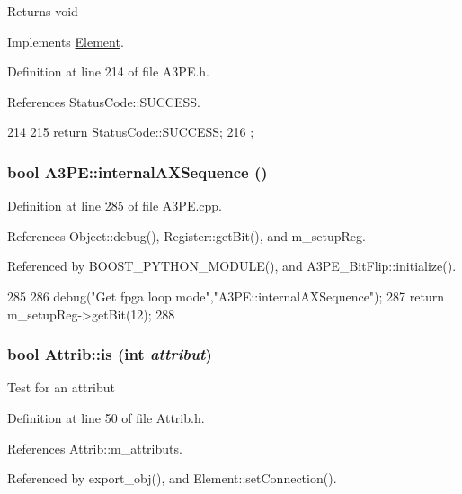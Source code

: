 \begin{DoxyReturn}{Returns}
void 
\end{DoxyReturn}


Implements \hyperlink{classElement_af42754b5cabc198869222725218d695c}{Element}.

Definition at line 214 of file A3PE.h.

References StatusCode::SUCCESS.


\begin{DoxyCode}
214                     {
215     return StatusCode::SUCCESS;
216   };
\end{DoxyCode}
\hypertarget{classA3PE_a4b9cf42bdd0a14e48807faa0956c59bd}{
\subsubsection[{internalAXSequence}]{\setlength{\rightskip}{0pt plus 5cm}bool A3PE::internalAXSequence ()}}
\label{classA3PE_a4b9cf42bdd0a14e48807faa0956c59bd}


Definition at line 285 of file A3PE.cpp.

References Object::debug(), Register::getBit(), and m\_\-setupReg.

Referenced by BOOST\_\-PYTHON\_\-MODULE(), and A3PE\_\-BitFlip::initialize().


\begin{DoxyCode}
285                              {
286   debug("Get fpga loop mode","A3PE::internalAXSequence");
287   return m_setupReg->getBit(12);
288 }
\end{DoxyCode}
\hypertarget{classAttrib_a704f26af560909ad22065083bb7d4c34}{
\subsubsection[{is}]{\setlength{\rightskip}{0pt plus 5cm}bool Attrib::is (int {\em attribut})}}
\label{classAttrib_a704f26af560909ad22065083bb7d4c34}
Test for an attribut 

Definition at line 50 of file Attrib.h.

References Attrib::m\_\-attributs.

Referenced by export\_\-obj(), and Element::setConnection().


